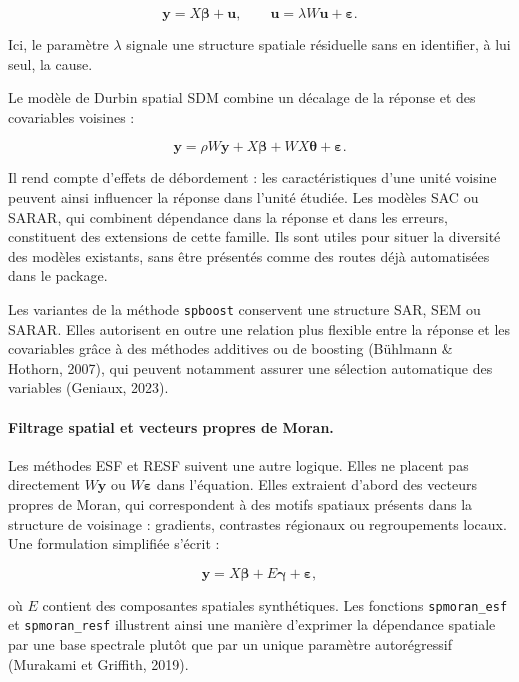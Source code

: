 \documentclass[11pt,a4paper]{article}
\begin{document}
\begin{equation}
    \mathbf{y}=X\boldsymbol{\beta}+\mathbf{u},
    \qquad
    \mathbf{u}=\lambda W\mathbf{u}+\boldsymbol{\varepsilon}.
\end{equation}

Ici, le paramètre $\lambda$ signale une structure spatiale résiduelle sans en identifier, à lui seul, la cause.

Le modèle de Durbin spatial SDM combine un décalage de la réponse et des covariables voisines :

\begin{equation}
    \mathbf{y}=\rho W\mathbf{y}+X\boldsymbol{\beta}+WX\boldsymbol{\theta}+\boldsymbol{\varepsilon}.
\end{equation}

Il rend compte d'effets de débordement : les caractéristiques d'une unité voisine peuvent ainsi influencer la réponse dans l'unité étudiée. Les modèles SAC ou SARAR, qui combinent dépendance dans la réponse et dans les erreurs, constituent des extensions de cette famille. Ils sont utiles pour situer la diversité des modèles existants, sans être présentés comme des routes déjà automatisées dans le package.

Les variantes de la méthode \texttt{spboost} conservent une structure SAR, SEM ou SARAR. Elles autorisent en outre une relation plus flexible entre la réponse et les covariables grâce à des méthodes additives ou de boosting (Bühlmann \& Hothorn, 2007), qui peuvent notamment assurer une sélection automatique des variables (Geniaux, 2023).

\paragraph{Filtrage spatial et vecteurs propres de Moran.}

Les méthodes ESF et RESF suivent une autre logique. Elles ne placent pas directement $W\mathbf{y}$ ou $W\boldsymbol{\varepsilon}$ dans l'équation. Elles extraient d'abord des vecteurs propres de Moran, qui correspondent à des motifs spatiaux présents dans la structure de voisinage : gradients, contrastes régionaux ou regroupements locaux. Une formulation simplifiée s'écrit :

\begin{equation}
    \mathbf{y}=X\boldsymbol{\beta}+E\boldsymbol{\gamma}+\boldsymbol{\varepsilon},
\end{equation}

où $E$ contient des composantes spatiales synthétiques. Les fonctions \texttt{spmoran\_esf} et \texttt{spmoran\_resf} illustrent ainsi une manière d'exprimer la dépendance spatiale par une base spectrale plutôt que par un unique paramètre autorégressif (Murakami et Griffith, 2019).
\end{document}

